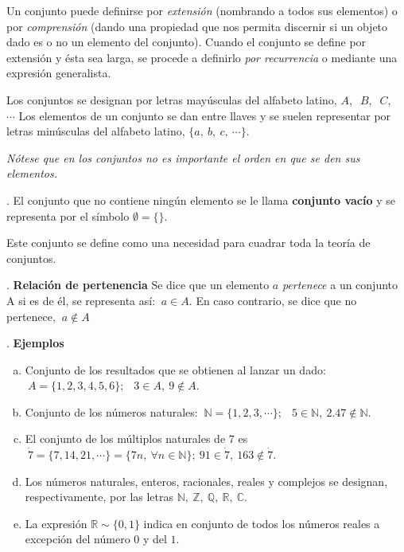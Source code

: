 Un conjunto puede definirse por \emph{extensión} (nombrando a todos sus elementos) o por \emph{comprensión} (dando una propiedad que nos permita discernir si un objeto dado es o no un elemento del conjunto). Cuando el conjunto se define por extensión y ésta sea larga, se procede a definirlo \emph{por recurrencia} o mediante una expresión generalista.

Los conjuntos se designan por letras mayúsculas del alfabeto latino, $A,\ $ $B, \ $ $C,\ $ $\cdots$  Los elementos de un conjunto se dan entre llaves y se suelen representar por letras minúsculas del alfabeto latino, $\{a,\ b,\ c,\ \cdots \}$.

\begin{destacado}
	\emph{Nótese que en los conjuntos no es importante el orden en que se den sus elementos.}
\end{destacado}

\begin{definition}
	. El conjunto que no contiene ningún elemento se le llama \textbf{conjunto vacío} y se representa por el símbolo $\emptyset=\{\}$. 

	Este conjunto se define como una necesidad para cuadrar toda la teoría de conjuntos.
\end{definition}

\begin{definition}
. \textbf{Relación de pertenencia}  Se dice que un elemento $a$ \emph{pertenece} a un conjunto A si es de él, se representa así: $\ a\in A$. En caso contrario, se dice que no pertenece, $\ a \notin A$	
\end{definition}


\begin{example} 
. \textbf{Ejemplos}	
\begin{enumerate}[a) ]
\vspace{-3mm} \item Conjunto de los resultados que se obtienen al lanzar un dado: $\ A=\{1,2,3,4,5,6\};\ $ $\ 3\in A,\ 9\notin A$.
\vspace{-3mm} \item Conjunto de los números naturales: $\ \mathbb N=\{1,2,3,\cdots\};\ $ $\ 5\in \mathbb N,\ 2.47 \notin \mathbb N$.
\vspace{-3mm} \item El conjunto de los múltiplos naturales de $7$ es $\ \dot{7}=\{7,14,21,\cdots\}=\{7n,\ \forall n\in \mathbb N\};\ 91 \in \dot 7,\ 163 \notin \dot 7$.
\vspace{-3mm} \item Los números naturales, enteros, racionales, reales y complejos se designan, respectivamente, por las letras $\mathbb N,\ \mathbb Z,\ \mathbb Q,\ \mathbb R,\ \mathbb C$.
\vspace{-3mm} \item La expresión $\mathbb R\sim \{0,1\}$ indica en conjunto de todos los números reales a excepción del número $0$ y del $1$.
\end{enumerate}
\end{example}

